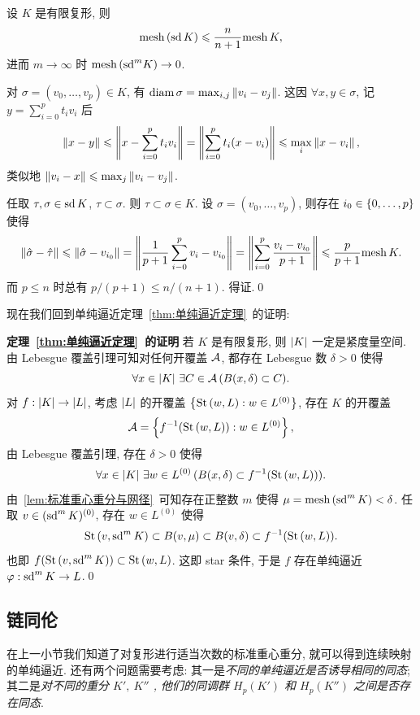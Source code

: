 \begin{Lemma}\label{lem:标准重心重分与网径}
	设 $ K $ 是有限复形, 则
	\[
		\mathrm{mesh}\,(\mathrm{sd}\,K)\leqslant\frac{n}{n+1}\mathrm{mesh}\, K,
	\]
	进而 $ m\to\infty $ 时 $ \mathrm{mesh}\,(\mathrm{sd}^m K)\to 0 $.
\end{Lemma}
\begin{Proof}
	对 $ \sigma=(v_0,\dots,v_p)\in K $, 有 $ \operatorname{diam}\sigma=\max_{i,j}\left\| v_i-v_j \right\| $. 这因 $ \forall x,y\in\sigma $, 记 $ y=\sum_{i=0}^pt_iv_i $ 后
	\[
		\left\| x-y \right\|\leqslant\left\| x-\sum_{i=0}^pt_iv_i \right\|=\left\| \sum_{i=0}^pt_i(x-v_i) \right\|\leqslant\max_{i}\left\| x-v_i \right\|,
	\]
	类似地 $ \left\| v_i-x \right\|\leqslant\max_j\left\| v_i-v_j \right\| $.

	任取 $ \tau,\sigma\in\mathrm{sd}\,K $, $ \tau\subset\sigma $. 则 $ \tau\subset\sigma\in K $. 设 $ \sigma=(v_0,\dots,v_p) $, 则存在 $ i_0\in\left\{ 0,\dots,p \right\} $ 使得
	\[
		\left\| \hat{\sigma}-\hat{\tau} \right\|\leqslant\left\| \hat{\sigma}-v_{i_0} \right\|=\left\| \frac{1}{p+1}\sum_{i-0}^pv_i-v_{i_0} \right\|=\left\| \sum_{i=0}^p\frac{v_i-v_{i_0}}{p+1} \right\|\leqslant\frac{p}{p+1}\mathrm{mesh}\, K.
	\]
	而 $ p\leqslant n $ 时总有 $ p/(p+1)\leqslant n/(n+1) $. 得证.\qed
\end{Proof}

现在我们回到单纯逼近定理~\ref{thm:单纯逼近定理}~的证明:

\textbf{定理~\ref{thm:单纯逼近定理}~的证明}\hspace{2\ccwd} 若 $ K $ 是有限复形, 则 $ \left| K \right|  $ 一定是紧度量空间. 由 Lebesgue 覆盖引理可知对任何开覆盖 $ \mathcal{A} $, 都存在 Lebesgue 数 $ \delta>0 $ 使得
\[
	\forall x\in\left| K \right| \,\exists C\in\mathcal{A}\,(B(x,\delta)\subset C).
\]
对 $ f : \left| K \right| \to\left| L \right|  $, 考虑 $ \left| L \right|  $ 的开覆盖 $ \left\{ \mathrm{St}\,(w,L) : w\in L^{(0)} \right\} $, 存在 $ K $ 的开覆盖
\[
	\mathcal{A}=\left\{ f^{-1}(\mathrm{St}\,(w,L)) : w\in L^{(0)} \right\},
\]
由 Lebesgue 覆盖引理, 存在 $ \delta>0 $ 使得
\[
	\forall x\in\left| K \right| \,\exists w\in L^{(0)}\,(B(x,\delta)\subset f^{-1}(\mathrm{St}\,(w,L))).
\]
由~\ref{lem:标准重心重分与网径}~可知存在正整数 $ m $ 使得 $ \mu=\mathrm{mesh}\,(\mathrm{sd}^m\,K)<\delta $. 任取 $ v\in(\mathrm{sd}^m\,K)^{(0)} $, 存在 $ w\in L^{(0)} $ 使得
\[
	\mathrm{St}\,(v,\mathrm{sd}^m\,K)\subset B(v,\mu)\subset B(v,\delta)\subset f^{-1}(\mathrm{St}\,(w,L)).
\]
也即 $ f(\mathrm{St}\,(v,\mathrm{sd}^m\,K))\subset\mathrm{St}\,(w,L) $. 这即 star 条件, 于是 $ f $ 存在单纯逼近 $ \varphi : \mathrm{sd}^m\,K\to L $.\qed

\subsection{链同伦}

在上一小节我们知道了对复形进行适当次数的标准重心重分, 就可以得到连续映射的单纯逼近. 还有两个问题需要考虑: 其一是\textit{不同的单纯逼近是否诱导相同的同态}; 其二是\textit{对不同的重分 $ K',\ K'' $ , 他们的同调群 $ H_p(K') $ 和 $ H_p(K'') $ 之间是否存在同态}.

